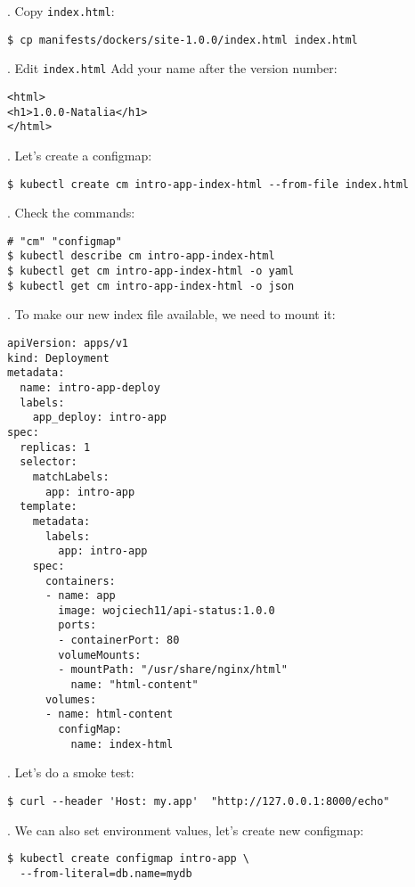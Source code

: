 \documentclass[12pt, letterpaper]{article}
\begin{document}
. Copy \verb|index.html|:

\begin{verbatim}
$ cp manifests/dockers/site-1.0.0/index.html index.html
\end{verbatim}

. Edit \verb|index.html| Add your name after the version number:

\begin{verbatim}
<html>
<h1>1.0.0-Natalia</h1>
</html>
\end{verbatim}

. Let's create a configmap:

\begin{verbatim}
$ kubectl create cm intro-app-index-html --from-file index.html
\end{verbatim}

. Check the commands:

\begin{verbatim}
# "cm" "configmap"
$ kubectl describe cm intro-app-index-html
$ kubectl get cm intro-app-index-html -o yaml
$ kubectl get cm intro-app-index-html -o json
\end{verbatim}

. To make our new index file available, we need to mount it:

\begin{verbatim}
apiVersion: apps/v1
kind: Deployment
metadata:
  name: intro-app-deploy
  labels:
    app_deploy: intro-app
spec:
  replicas: 1
  selector:
    matchLabels:
      app: intro-app
  template:
    metadata:
      labels:
        app: intro-app
    spec:
      containers:
      - name: app
        image: wojciech11/api-status:1.0.0
        ports:
        - containerPort: 80
        volumeMounts:
        - mountPath: "/usr/share/nginx/html"
          name: "html-content"
      volumes:
      - name: html-content
        configMap:
          name: index-html
\end{verbatim}

. Let's do a smoke test:

\begin{verbatim}
$ curl --header 'Host: my.app'  "http://127.0.0.1:8000/echo"
\end{verbatim}

. We can also set environment values, let's create new configmap:

\begin{verbatim}
$ kubectl create configmap intro-app \
  --from-literal=db.name=mydb
\end{verbatim}
\end{document}
